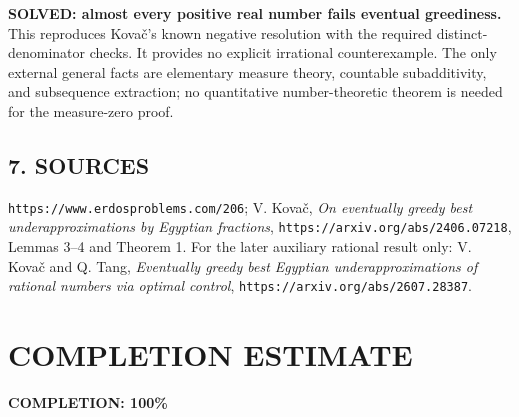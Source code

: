 \textbf{SOLVED: almost every positive real number fails eventual greediness.}
This reproduces Kova\v{c}'s known negative resolution with the required distinct-denominator checks. It provides no explicit irrational counterexample. The only external general facts are elementary measure theory, countable subadditivity, and subsequence extraction; no quantitative number-theoretic theorem is needed for the measure-zero proof.
\subsection*{7. SOURCES}
\texttt{https://www.erdosproblems.com/206}; V. Kova\v{c}, \emph{On eventually greedy best underapproximations by Egyptian fractions}, \texttt{https://arxiv.org/abs/2406.07218}, Lemmas 3--4 and Theorem 1. For the later auxiliary rational result only: V. Kova\v{c} and Q. Tang, \emph{Eventually greedy best Egyptian underapproximations of rational numbers via optimal control}, \texttt{https://arxiv.org/abs/2607.28387}.
\section{COMPLETION ESTIMATE}
\textbf{COMPLETION: 100\%}
